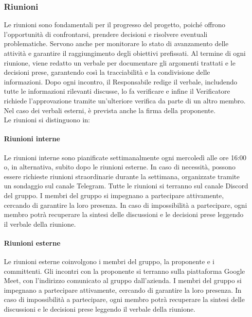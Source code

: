 \documentclass[10pt]{article}
\begin{document}
\begin{justify}
    \subsubsection{Riunioni}
    Le riunioni sono fondamentali per il progresso del progetto, poiché offrono l'opportunità di confrontarsi, prendere decisioni e risolvere eventuali problematiche. Servono anche per monitorare lo stato di avanzamento delle attività e garantire il raggiungimento degli obiettivi prefissati.
    Al termine di ogni riunione, viene redatto un verbale per documentare gli argomenti trattati e le decisioni prese, garantendo così la tracciabilità e la condivisione delle informazioni. Dopo ogni incontro, il Responsabile redige il verbale, includendo tutte le informazioni rilevanti discusse, lo fa verificare e infine il Verificatore richiede l'approvazione tramite un'ulteriore verifica da parte di un altro membro. Nel caso dei verbali esterni, è prevista anche la firma della proponente.\\
    Le riunioni si distinguono in:

        \paragraph{Riunioni interne}
        Le riunioni interne sono pianificate settimanalmente ogni mercoledì alle ore 16:00 o, in alternativa, subito dopo le riunioni esterne. In caso di necessità, possono essere richieste riunioni straordinarie durante la settimana, organizzate tramite un sondaggio sul canale Telegram. Tutte le riunioni si terranno sul canale Discord del gruppo. I membri del gruppo si impegnano a partecipare attivamente, cercando di garantire la loro presenza. In caso di impossibilità a partecipare, ogni membro potrà recuperare la sintesi delle discussioni e le decisioni prese leggendo il verbale della riunione.

        \paragraph{Riunioni esterne}
        Le riunioni esterne coinvolgono i membri del gruppo, la proponente e i committenti. Gli incontri con la proponente si terranno sulla piattaforma Google Meet, con l'indirizzo comunicato al gruppo dall'azienda. I membri del gruppo si impegnano a partecipare attivamente, cercando di garantire la loro presenza. In caso di impossibilità a partecipare, ogni membro potrà recuperare la sintesi delle discussioni e le decisioni prese leggendo il verbale della riunione.


\end{justify}
\end{document}
